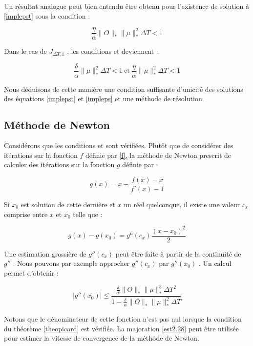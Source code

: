 Un résultat analogue peut bien entendu être obtenu pour l'existence de solution à \eqref{implepst} sous la condition :

\begin{equation} \label{cond2.27}
\frac{\eta}{\alpha} \lVert O\rVert_* \lVert \mu \rVert _*^2 \Delta T < 1
\end{equation}

Dans le cas de $J_{\Delta T,1}$ , les conditions \label{cond2.26} et \label{cond2.27} deviennent :

$$ \frac{\delta}{\alpha} \lVert \mu \rVert _*^2 \Delta T <1 \ \text{et}\  \frac{\eta}{\alpha} \lVert \mu \rVert _*^2 \Delta T <1 $$

Nous déduisons de cette manière une condition suffisante d'unicité des solutions des équations \eqref{implepst} et \eqref{impleps} et une méthode de résolution.

\subsection{Méthode de Newton}
Considérons que les conditions \label{cond2.26} et \label{cond2.27} sont vérifiées. Plutôt que de considérer des itérations sur la fonction $f$ définie par \eqref{f}, la méthode de Newton prescrit de calculer des itérations sur la fonction $g$ définie par :

$$ g(x) = x -\frac{f(x) - x}{f'(x) - 1} $$

Si $x_0$ est solution de cette dernière et $x$ un réel quelconque, il existe une valeur $c_x$ comprise entre $x$ et $x_0$ telle que :

$$ g(x)-g(x_0) = g^n(c_x) \frac{(x-x_0)^2}{2} $$

Une estimation grossière de $g''(c_x)$ peut être faite à partir de la continuité de $g''$ . Nous pouvons par exemple approcher $g''(c_x)$  par $g''(x_0)$  . Un calcul permet d'obtenir :

\begin{equation} \label{est2.28}
|g''(x_0)| \leq \frac{\frac{\delta}{\alpha} \lVert O\rVert_* \lVert \mu \rVert _*^3 \Delta T^2 }{1-\frac{\delta}{\alpha} \lVert O\rVert_* \lVert \mu \rVert _*^2 \Delta T}
\end{equation}

Notons que le dénominateur de cette fonction n'est pas nul lorsque la condition du théorème \ref{theopicard} est vérifiée. La majoration \eqref{est2.28} peut être utilisée pour estimer la vitesse de convergence de la méthode de Newton.

